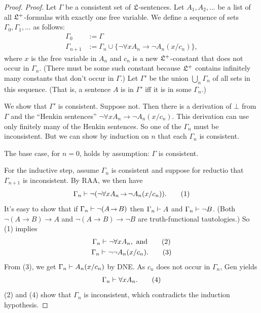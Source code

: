 \begin{proof}
  \emph{Proof}.
  Let $\Gamma$ be a consistent set of $\mathfrak{L}$-sentences.
  Let $A_{1}, A_{2}, \ldots$ be a list of all $\mathfrak{L}^{+}$-formulas with exactly one free variable.
  We define a sequence of sets $\Gamma_{0}, \Gamma_{1}, \ldots$ as follows:
  \begin{align*}
    \Gamma_{0} & := \Gamma \\
    \Gamma_{n+1} & := \Gamma_{n} \cup \{ \neg \forall x A_{n} \to \neg A_{n}(x/c_{n}) \},
  \end{align*}
  where $x$ is the free variable in $A_{n}$ and
  $c_{n}$ is a new $\mathfrak{L}^{+}$-constant that does not occur in $\Gamma_{n}$.
  (There must be some such constant because $\mathfrak{L}^{+}$ contains infinitely many constants
  that don't occur in $\Gamma$.)
  Let $\Gamma'$ be the union $\bigcup_{n} \Gamma_{n}$ of all sets in this sequence.
  (That is, a sentence $A$ is in $\Gamma'$ iff it is in some $\Gamma_{n}$.)


  We show that $\Gamma'$ is consistent.
  Suppose not.
  Then there is a derivation of $\bot$ from $\Gamma$
  and the ``Henkin sentences'' $\neg \forall x A_{n} \to \neg A_{n}(x/c_{n})$.
  This derivation can use only finitely many of the Henkin sentences.
  So one of the $\Gamma_{n}$ must be inconsistent.
  But we can show by induction on $n$ that each $\Gamma_{n}$ is consistent.

  The base case, for $n=0$, holds by assumption: $\Gamma$ is consistent.

  For the inductive step, assume $\Gamma_{n}$ is consistent and
  suppose for reductio that $\Gamma_{n+1}$ is inconsistent.
  By RAA, we then have
  \begin{gather}
    \Gamma_{n} \proves \neg (\neg\forall x A_{n} \to \neg A_{n}(x/c_{n})). \tag{1}
  \end{gather}
  It's easy to show that
  if $\Gamma_n \proves \neg (A \to B)$ then
  $\Gamma_n \vdash A$ and $\Gamma_n \vdash \neg B$.
  (Both $\neg (A \to B) \to A$ and $\neg (A \to B) \to \neg B$ are truth-functional tautologies.)
  So (1) implies
  \begin{gather}
    \Gamma_{n} \vdash \neg \forall x A_{n}, \text{ and} \tag{2}\\
    \Gamma_{n} \vdash \neg\neg A_{n}(x/c_{n}). \tag{3}
  \end{gather}
  From (3), we get $\Gamma_{n} \vdash A_{n}(x/c_{n})$ by DNE.
  As $c_{n}$ does not occur in $\Gamma_{n}$,
  Gen yields
  \begin{gather}
    \Gamma_{n} \vdash \forall x A_{n}. \tag{4}
  \end{gather}
  (2) and (4) show that $\Gamma_{n}$ is inconsistent,
  which contradicts the induction hypothesis.


\end{proof}
